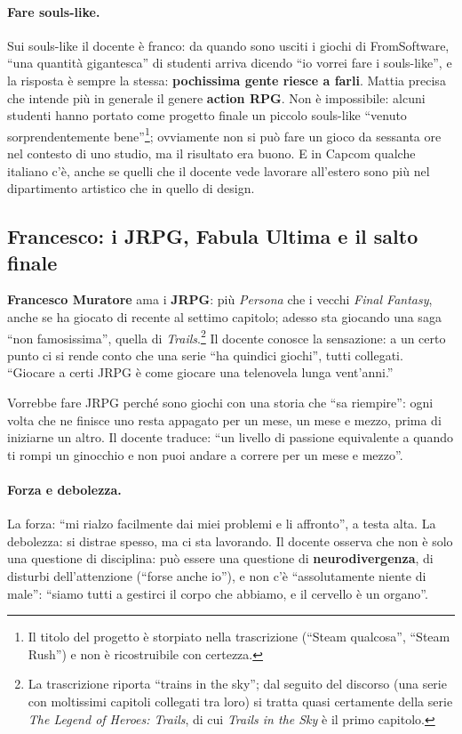 \paragraph{Fare souls-like.} Sui souls-like il docente è franco: da quando
sono usciti i giochi di FromSoftware, ``una quantità gigantesca'' di studenti
arriva dicendo ``io vorrei fare i souls-like'', e la risposta è sempre la
stessa: \textbf{pochissima gente riesce a farli}. Mattia precisa che intende
più in generale il genere \textbf{action RPG}. Non è impossibile: alcuni
studenti hanno portato come progetto finale un piccolo souls-like ``venuto
sorprendentemente bene''\footnote{Il titolo del progetto è storpiato nella
trascrizione (``Steam qualcosa'', ``Steam Rush'') e non è ricostruibile con
certezza.}; ovviamente non si può fare un gioco da sessanta ore nel contesto di
uno studio, ma il risultato era buono. E in Capcom qualche italiano c'è, anche
se quelli che il docente vede lavorare all'estero sono più nel dipartimento
artistico che in quello di design.

\subsection{Francesco: i JRPG, Fabula Ultima e il salto finale}

\textbf{Francesco Muratore} ama i \textbf{JRPG}: più \emph{Persona} che i
vecchi \emph{Final Fantasy}, anche se ha giocato di recente al settimo
capitolo; adesso sta giocando una saga ``non famosissima'', quella di
\emph{Trails}.\footnote{La trascrizione riporta ``trains in the sky''; dal
seguito del discorso (una serie con moltissimi capitoli collegati tra loro) si
tratta quasi certamente della serie \emph{The Legend of Heroes: Trails}, di
cui \emph{Trails in the Sky} è il primo capitolo.} Il docente conosce la
sensazione: a un certo punto ci si rende conto che una serie ``ha quindici
giochi'', tutti collegati. ``Giocare a certi JRPG è come giocare una
telenovela lunga vent'anni.''

Vorrebbe fare JRPG perché sono giochi con una storia che ``sa riempire'':
ogni volta che ne finisce uno resta appagato per un mese, un mese e mezzo,
prima di iniziarne un altro. Il docente traduce: ``un livello di passione
equivalente a quando ti rompi un ginocchio e non puoi andare a correre per un
mese e mezzo''.

\paragraph{Forza e debolezza.} La forza: ``mi rialzo facilmente dai miei
problemi e li affronto'', a testa alta. La debolezza: si distrae spesso, ma ci
sta lavorando. Il docente osserva che non è solo una questione di disciplina:
può essere una questione di \textbf{neurodivergenza}, di disturbi
dell'attenzione (``forse anche io''), e non c'è ``assolutamente niente di
male'': ``siamo tutti a gestirci il corpo che abbiamo, e il cervello è un
organo''.

